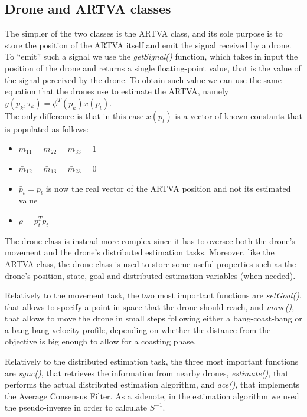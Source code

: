 \subsection{Drone and ARTVA classes}
The simpler of the two classes is the ARTVA class, and its sole purpose is to store the position of the ARTVA itself and emit the signal received by a drone. To “emit” such a signal we use the \textit{getSignal()} function, which takes in input the position of the drone and returns a single floating-point value, that is the value of the signal perceived by the drone. To obtain such value we can use the same equation that the drones use to estimate the ARTVA, namely $y(p_k,\tau_k) = \phi^T(p_k)x(p_t)$.\\
The only difference is that in this case $x(p_t)$ is a vector of known constants that is populated as follows: 
\begin{itemize}
    \item $\bar{m}_{11} = \bar{m}_{22} = \bar{m}_{33} = 1$
    \item $\bar{m}_{12} = \bar{m}_{13} = \bar{m}_{23} = 0$
    \item $\bar{p}_t = p_t$ is now the real vector of the ARTVA position and not its estimated value
    \item $\rho = p^T_tp_t$
\end{itemize}

The drone class is instead more complex since it has to oversee both the drone’s movement and the drone’s distributed estimation tasks. Moreover, like the ARTVA class, the drone class is used to store some useful properties such as the drone’s position, state, goal and distributed estimation variables (when needed). 

Relatively to the movement task, the two most important functions are \textit{setGoal()}, that allows to specify a point in space that the drone should reach, and \textit{move()}, that allows to move the drone in small steps following either a bang-coast-bang or a bang-bang velocity profile, depending on whether the distance from the objective is big enough to allow for a coasting phase. 

Relatively to the distributed estimation task, the three most important functions are \textit{sync()}, that retrieves the information from nearby drones, \textit{estimate()}, that performs the actual distributed estimation algorithm, and \textit{ace()}, that implements the Average Consensus Filter. As a sidenote, in the estimation algorithm we used the pseudo-inverse in order to calculate $S^{-1}$.

